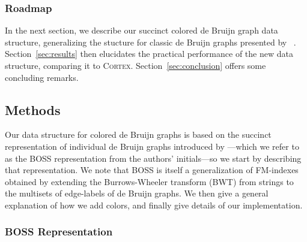 \subsubsection{Roadmap}
In the next section, we describe our succinct colored de Bruijn graph data structure, generalizing the stucture for classic de Bruijn graphs presented by ~\cite{BOSS12}. Section~\ref{sec:results} then elucidates the practical performance of the new data structure, comparing it to \textsc{Cortex}. Section~\ref{sec:conclusion} offers some concluding remarks.


\label{sec:methods}
\subsection{Methods}
Our data structure for colored de Bruijn graphs is based on the succinct representation of individual de Bruijn graphs introduced by \cite{BOSS12}---which we refer to as the BOSS representation from the authors' initials---so we start by describing that representation.  We note that BOSS is itself a generalization of FM-indexes~\citep{fm2005} obtained by extending the Burrows-Wheeler transform (BWT) from strings to the multisets of edge-labels of de Bruijn graphs.  We then give a general explanation of how we add colors, and finally give details of our implementation.

\subsubsection{BOSS Representation}
\label{subsec:boss}

